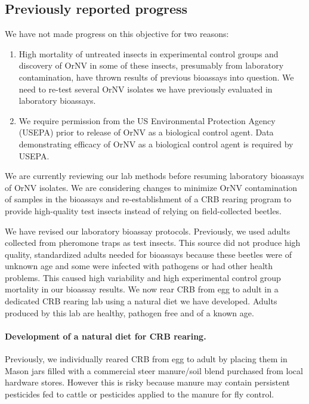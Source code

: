\documentclass[12pt,letterpaper,english,bibliography=totocnumbered, abstract=on]{scrartcl}
\begin{document}
\subsection{Previously reported progress}

We have not made progress on this objective for two reasons:
\begin{enumerate}
	\item High mortality of untreated insects in experimental control groups and discovery of OrNV in some of these insects, presumably from laboratory contamination, have thrown results of previous bioassays into question.  We need to re-test several OrNV isolates we have previously evaluated in laboratory bioassays.
	\item We require permission from the US Environmental Protection Agency (USEPA) prior to release of OrNV as a biological control agent. Data demonstrating efficacy of OrNV as a biological control agent is required by USEPA.  
\end{enumerate}

We are currently reviewing our lab methods before resuming laboratory bioassays of OrNV isolates. We are considering changes to minimize OrNV contamination of samples in the bioassays and re-establishment of a CRB rearing program to provide high-quality test insects instead of relying on field-collected beetles.

We have revised our laboratory bioassay protocols. Previously, we used adults collected from pheromone traps as test insects. This source did not produce high quality, standardized adults needed for bioassays because these beetles were of unknown age and some were infected with pathogens or had other health problems. This caused high variability and high experimental control group mortality in our bioassay results. We now rear CRB from egg to adult in a dedicated CRB rearing lab using a natural diet we have developed. Adults produced by this lab are healthy, pathogen free and of a known age.

\paragraph{Development of a natural diet for CRB rearing.}

Previously, we individually reared CRB from egg to adult by placing them in Mason jars filled with a commercial steer manure/soil blend purchased from local hardware stores. However this is risky because manure may contain persistent pesticides fed to cattle or pesticides applied to the manure for fly control. 
\end{document}
